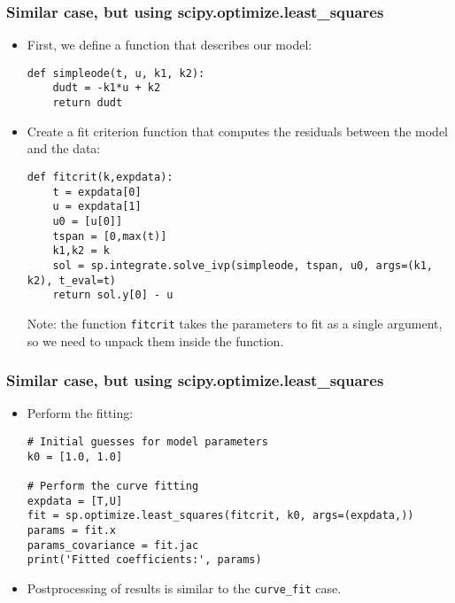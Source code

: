 \begin{frame}[fragile] 
    \frametitle{Similar case, but using scipy.optimize.least\_squares}
    \begin{itemize}
      \item First, we define a function that describes our model:
      \begin{lstlisting}
def simpleode(t, u, k1, k2):
    dudt = -k1*u + k2
    return dudt
      \end{lstlisting}
      \pause
      \item Create a fit criterion function that computes the residuals between the model and the data:
      \begin{lstlisting}
def fitcrit(k,expdata):
    t = expdata[0]
    u = expdata[1]
    u0 = [u[0]]
    tspan = [0,max(t)]
    k1,k2 = k
    sol = sp.integrate.solve_ivp(simpleode, tspan, u0, args=(k1, k2), t_eval=t)
    return sol.y[0] - u
      \end{lstlisting}
      Note: the function \lstinline|fitcrit| takes the parameters to fit as a single argument, so we need to unpack them inside the function.
    \end{itemize}
\end{frame}

\begin{frame}[fragile] 
    \frametitle{Similar case, but using scipy.optimize.least\_squares}
    \begin{itemize}
      \item Perform the fitting:
      \begin{lstlisting}
# Initial guesses for model parameters
k0 = [1.0, 1.0]

# Perform the curve fitting
expdata = [T,U]
fit = sp.optimize.least_squares(fitcrit, k0, args=(expdata,))
params = fit.x
params_covariance = fit.jac
print('Fitted coefficients:', params)
      \end{lstlisting}
      \item Postprocessing of results is similar to the \lstinline|curve_fit| case.
    \end{itemize}
\end{frame}


    
